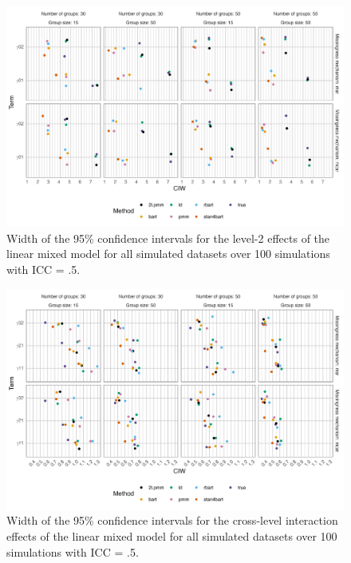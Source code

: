 \documentclass[preprint,12pt]{elsarticle}
\begin{document}
\begin{figure}[H]
    \centering
    \includegraphics[width=1\textwidth]{ciwlevel2.png}
    \caption{Width of the 95\% confidence intervals for the level-2 effects of the linear mixed model for all simulated datasets over 100 simulations with ICC = .5.}
    \label{fig:ciwlevel2}
\end{figure}

\begin{figure}[H]
    \centering
    \includegraphics[width=1\textwidth]{ciwcrosslevel.png}
    \caption{Width of the 95\% confidence intervals for the cross-level interaction effects of the linear mixed model for all simulated datasets over 100 simulations with ICC = .5.}
    \label{fig:ciwcrosslevel}
\end{figure}
\end{document}
